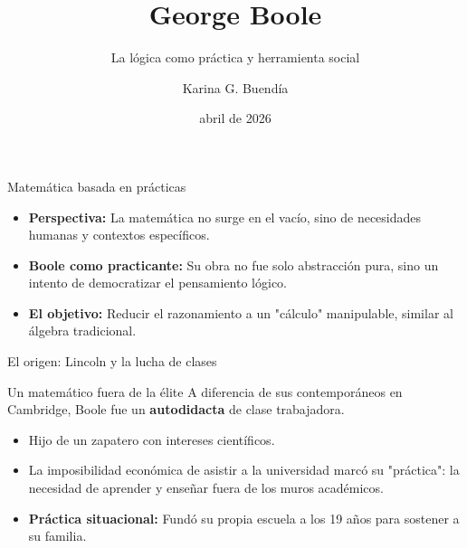 \documentclass{beamer}
\title{George Boole}
\subtitle{La lógica como práctica y herramienta social}
\author{Karina G. Buendía}
\date{abril de 2026}
\begin{document}
\frame{\titlepage}

\begin{frame}{Matemática basada en prácticas}
    \begin{itemize}
        \item \textbf{Perspectiva:} La matemática no surge en el vacío, sino de necesidades humanas y contextos específicos.
        \item \textbf{Boole como practicante:} Su obra no fue solo abstracción pura, sino un intento de democratizar el pensamiento lógico.
        \item \textbf{El objetivo:} Reducir el razonamiento a un "cálculo" manipulable, similar al álgebra tradicional.
    \end{itemize}
\end{frame}

\begin{frame}{El origen: Lincoln y la lucha de clases}
    \begin{block}{Un matemático fuera de la élite}
        A diferencia de sus contemporáneos en Cambridge, Boole fue un \textbf{autodidacta} de clase trabajadora.
    \end{block}
    \begin{itemize}
        \item Hijo de un zapatero con intereses científicos.
        \item La imposibilidad económica de asistir a la universidad marcó su "práctica": la necesidad de aprender y enseñar fuera de los muros académicos.
        \item \textbf{Práctica situacional:} Fundó su propia escuela a los 19 años para sostener a su familia.
    \end{itemize}
\end{frame}
\end{document}
